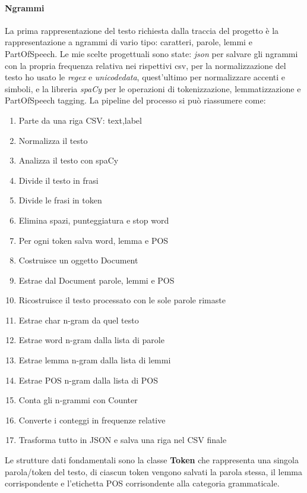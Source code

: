\documentclass[a4paper,12pt]{report}
\begin{document}
    \paragraph{Ngrammi}
    La prima rappresentazione del testo richiesta dalla traccia del progetto è la rappresentazione a ngrammi di vario tipo: caratteri, parole, lemmi e PartOfSpeech. 
    Le mie scelte progettuali sono state: \textit{json} per salvare gli ngrammi con la propria frequenza relativa nei rispettivi csv, per la normalizzazione del testo ho usato le \textit{regex} e \textit{unicodedata}, quest'ultimo per normalizzare accenti e simboli, e la libreria \textit{spaCy} per le operazioni di tokenizzazione, lemmatizzazione e PartOfSpeech tagging. 
    La pipeline del processo si può riassumere come:
    \begin{enumerate}
        \item Parte da una riga CSV: text,label
        \item Normalizza il testo
        \item Analizza il testo con spaCy
        \item Divide il testo in frasi
        \item Divide le frasi in token
        \item Elimina spazi, punteggiatura e stop word
        \item Per ogni token salva word, lemma e POS
        \item Costruisce un oggetto Document
        \item Estrae dal Document parole, lemmi e POS
        \item Ricostruisce il testo processato con le sole parole rimaste
        \item Estrae char n-gram da quel testo
        \item Estrae word n-gram dalla lista di parole
        \item Estrae lemma n-gram dalla lista di lemmi
        \item Estrae POS n-gram dalla lista di POS
        \item Conta gli n-grammi con Counter
        \item Converte i conteggi in frequenze relative
        \item Trasforma tutto in JSON e salva una riga nel CSV finale
    \end{enumerate}
    Le strutture dati fondamentali sono la classe \textbf{Token} che rappresenta una singola parola/token del testo, di ciascun token vengono salvati la parola stessa, il lemma corrispondente e l'etichetta POS corrisondente alla categoria grammaticale.
\end{document}
